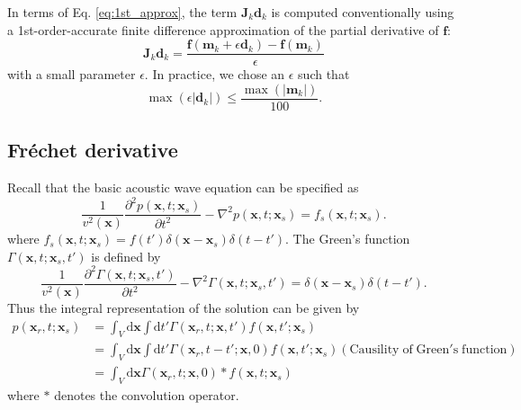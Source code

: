 In terms of Eq. \eqref{eq:1st_approx}, the term $\textbf{J}_k\textbf{d}_k$ is computed conventionally using a 1st-order-accurate finite difference approximation of the partial derivative of $\textbf{f}$:
\begin{equation}
\textbf{J}_k\textbf{d}_k=\frac{\textbf{f}(\textbf{m}_k+\epsilon \textbf{d}_k)-\textbf{f}(\textbf{m}_k)}{\epsilon}
\end{equation}
with a small parameter $\epsilon$. In practice, we chose an $\epsilon$ such that
\begin{equation}
\max(\epsilon |\textbf{d}_k|)\leqslant \frac{\max(|\textbf{m}_k|)}{100}.
\end{equation}

\subsection{Fréchet derivative}

Recall that the basic acoustic wave equation can be specified as
\begin{equation}\label{eq:acoustic}
\frac{1}{v^2(\textbf{x})}\frac{\partial^2 p(\textbf{x},t;\textbf{x}_s)}{\partial t^2}-\nabla^2 p(\textbf{x},t;\textbf{x}_s)=f_s(\textbf{x},t;\textbf{x}_s).
\end{equation}
where $ f_s(\textbf{x},t;\textbf{x}_s)=f(t')\delta(\textbf{x}-\textbf{x}_s)\delta(t-t')$.
The Green's function $\Gamma(\textbf{x},t;\textbf{x}_s,t')$ is defined by
\begin{equation}
\frac{1}{v^2(\textbf{x})}\frac{\partial^2 \Gamma(\textbf{x},t;\textbf{x}_s,t')}{\partial t^2}
-\nabla^2 \Gamma(\textbf{x},t; \textbf{x}_s,t')
=\delta(\textbf{x}-\textbf{x}_s)\delta(t-t').
\end{equation}
Thus the integral representation of the solution can be given by
\begin{equation}
\begin{split}
p(\textbf{x}_r,t; \textbf{x}_s)&=\int_V \mathrm{d}\textbf{x}\int\mathrm{d}t'\Gamma(\textbf{x}_r,t;\textbf{x},t')f(\textbf{x},t';\textbf{x}_s)\\
&=\int_V \mathrm{d}\textbf{x}\int\mathrm{d}t'\Gamma(\textbf{x}_r,t-t';\textbf{x},0)f(\textbf{x},t';\textbf{x}_s)(\mathrm{Causility\; of\; Green's\; function})\\
&=\int_V \mathrm{d}\textbf{x}\Gamma(\textbf{x}_r,t;\textbf{x},0)*f(\textbf{x},t;\textbf{x}_s)
\end{split}
\end{equation}
where $*$ denotes the convolution operator.

